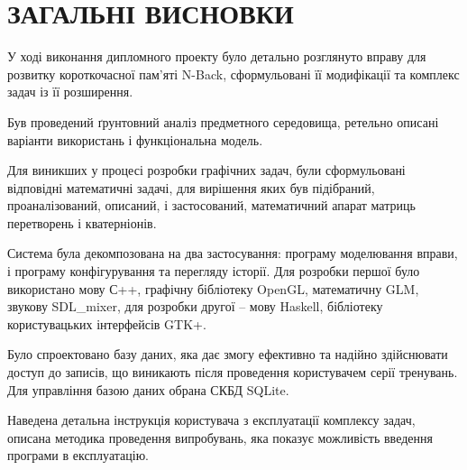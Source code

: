 \section*{ЗАГАЛЬНІ ВИСНОВКИ}
%

У ході виконання дипломного проекту було детально розглянуто вправу для розвитку короткочасної пам'яті N-Back, сформульовані її модифікації та комплекс задач із її розширення.

Був проведений ґрунтовний аналіз предметного середовища, ретельно описані варіанти використань і функціональна модель.

Для виникших у процесі розробки графічних задач, були сформульовані відповідні математичні задачі, для вирішення яких був підібраний, проаналізований, описаний, і застосований, математичний апарат матриць перетворень і кватерніонів.

Система була декомпозована на два застосування: програму моделювання вправи, і програму конфігурування та перегляду історії. Для розробки першої було використано мову С++, графічну бібліотеку OpenGL, математичну GLM, звукову SDL_mixer, для розробки другої -- мову Haskell, бібліотеку користувацьких інтерфейсів GTK+.

Було спроектовано базу даних, яка дає змогу ефективно та надійно здійснювати доступ до записів, що виникають після проведення користувачем серії тренувань. Для управління базою даних обрана СКБД SQLite.

Наведена детальна інструкція користувача з експлуатації комплексу задач, описана методика проведення випробувань, яка показує можливість введення програми в експлуатацію.
